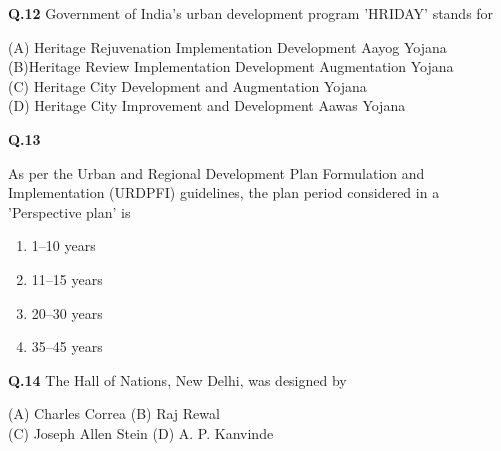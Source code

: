 \documentclass[journal,12pt,onecolumn]{IEEEtran}
\theoremstyle{remark}
\begin{document}
\noindent 
\textbf{Q.12} \hspace{0.5cm} Government of India's urban development program 'HRIDAY' stands for
\vspace{0.15cm}
\begin{flushleft}
    
  \hspace{1.5cm} (A) Heritage Rejuvenation Implementation Development Aayog Yojana\\
  \hspace{1.5cm} (B)Heritage Review Implementation Development Augmentation Yojana\\
  \hspace{1.5cm} (C) Heritage City Development and Augmentation Yojana\\
  \hspace{1.5cm} (D) Heritage City Improvement and Development Aawas Yojana\\
\end{flushleft}

\vspace{0.3cm}

\noindent \textbf{Q.13} \hspace{0.4cm} \parbox[t]{13cm}{ As per the Urban and Regional Development Plan Formulation and Implementation (URDPFI) guidelines, the plan period considered in a 'Perspective plan' is}
\vspace{0.4cm}

\begin{enumerate}[label=(\Alph*),leftmargin=1.5cm]
    \item 1--10 years
    \item 11--15 years
    \item 20--30 years
    \item 35--45 years
\end{enumerate}

\vspace{0.2cm}

\noindent \textbf{Q.14} \hspace{0.5cm} The Hall of Nations, New Delhi, was designed by

\begin{flushleft}
    \hspace{2.2cm} (A) Charles Correa \hspace{3.5cm} (B) Raj Rewal \\
    \hspace{2.3cm}(C) Joseph Allen Stein \hspace{3cm} (D) A. P. Kanvinde
\end{flushleft} 
\vspace{0.6cm}
\end{document}
